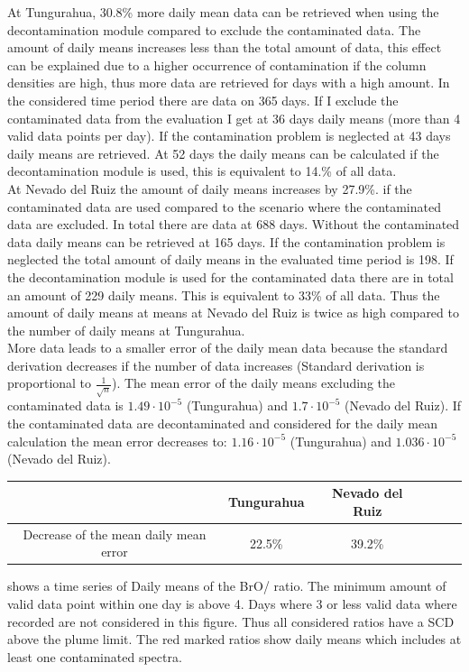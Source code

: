 \documentclass  [
  paper    = a4,
  BCOR     = 10mm,
  twoside,
  fontsize = 12pt,
  fleqn,
  toc      = bibnumbered,
  toc      = listofnumbered,
  numbers  = noendperiod,
  headings = normal,
  listof   = leveldown,
  version  = 3.03
]                                       {scrreprt}
\begin{document}
At Tungurahua, 30.8\% more daily mean data can be retrieved when using the decontamination module compared to exclude the contaminated data. The amount of daily means increases less than the total amount of data, this effect can be explained due to a higher occurrence of contamination if the   column densities are high, thus more data are retrieved for days with a high   amount.
In the considered time period there are data on 365 days. 
If I exclude the contaminated data from the evaluation I get at 36 days daily means (more than 4 valid data points per day). If the contamination problem is neglected at 43 days daily means are retrieved. At 52 days the daily means can be calculated if the decontamination module is used, this is equivalent to 14.\% of all data.\\

At Nevado del Ruiz the amount of daily means increases by 27.9\%. if the contaminated data are used compared to the scenario where the contaminated data are excluded.
In total there are data at 688 days. Without the contaminated data daily means can be retrieved at 165 days.
If the contamination problem is neglected the total amount of daily means in the evaluated time period is 198. If the decontamination module is used for the contaminated data there are in total an amount of 229 daily means. This is equivalent to 33\% of all data. Thus the amount of daily means at means at Nevado del Ruiz is twice as high compared to the number of daily means at Tungurahua.\\
%
More data leads to a smaller error of the daily mean data because the standard derivation decreases if the number of data increases (Standard derivation is proportional to $\frac{1}{\sqrt{n}}$). The mean error of the daily means excluding the contaminated data is $1.49\cdot 10^{-5}$ (Tungurahua) and $1.7\cdot 10^{-5}$ (Nevado del Ruiz). If the contaminated data are decontaminated and considered for the daily mean calculation the mean error decreases to: $1.16\cdot 10^{-5}$ (Tungurahua) and $1.036\cdot 10^{-5}$ (Nevado del Ruiz).
\begin{table}[h!]
	\centering
	\begin{tabular}{ccc p{4cm}p{4cm}p{4cm}}
		&Tungurahua&Nevado del Ruiz\\
		\toprule
		Decrease of the mean daily mean error&22.5\%&39.2\%\\
		\bottomrule            
	\end{tabular}
\end{table}        
 shows a time series of Daily means of the BrO/ ratio. The minimum amount of valid data point within one day is above 4. Days where 3 or less valid data where recorded are not considered in this figure.  Thus all considered ratios have a  SCD above the plume limit. The red marked ratios show daily means which includes at least one contaminated spectra.
\end{document}
